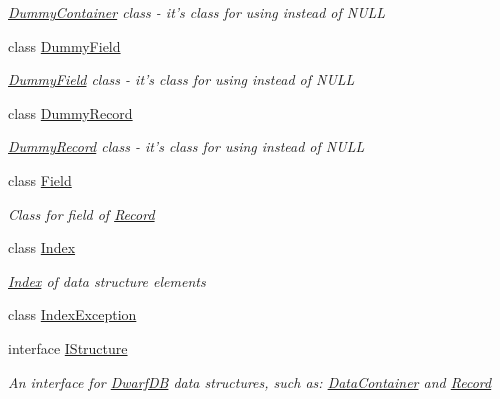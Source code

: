 \begin{DoxyCompactItemize}
\begin{DoxyCompactList}\small\item\em \hyperlink{class_dwarf_d_b_1_1_data_structures_1_1_dummy_container}{Dummy\+Container} class -\/ it's class for using instead of N\+U\+L\+L \end{DoxyCompactList}\item 
class \hyperlink{class_dwarf_d_b_1_1_data_structures_1_1_dummy_field}{Dummy\+Field}
\begin{DoxyCompactList}\small\item\em \hyperlink{class_dwarf_d_b_1_1_data_structures_1_1_dummy_field}{Dummy\+Field} class -\/ it's class for using instead of N\+U\+L\+L \end{DoxyCompactList}\item 
class \hyperlink{class_dwarf_d_b_1_1_data_structures_1_1_dummy_record}{Dummy\+Record}
\begin{DoxyCompactList}\small\item\em \hyperlink{class_dwarf_d_b_1_1_data_structures_1_1_dummy_record}{Dummy\+Record} class -\/ it's class for using instead of N\+U\+L\+L \end{DoxyCompactList}\item 
class \hyperlink{class_dwarf_d_b_1_1_data_structures_1_1_field}{Field}
\begin{DoxyCompactList}\small\item\em Class for field of \hyperlink{class_dwarf_d_b_1_1_data_structures_1_1_record}{Record} \end{DoxyCompactList}\item 
class \hyperlink{class_dwarf_d_b_1_1_data_structures_1_1_index}{Index}
\begin{DoxyCompactList}\small\item\em \hyperlink{class_dwarf_d_b_1_1_data_structures_1_1_index}{Index} of data structure elements \end{DoxyCompactList}\item 
class \hyperlink{class_dwarf_d_b_1_1_data_structures_1_1_index_exception}{Index\+Exception}
\item 
interface \hyperlink{interface_dwarf_d_b_1_1_data_structures_1_1_i_structure}{I\+Structure}
\begin{DoxyCompactList}\small\item\em An interface for \hyperlink{namespace_dwarf_d_b}{Dwarf\+D\+B} data structures, such as\+: \hyperlink{class_dwarf_d_b_1_1_data_structures_1_1_data_container}{Data\+Container} and \hyperlink{class_dwarf_d_b_1_1_data_structures_1_1_record}{Record} \end{DoxyCompactList}\item 

\end{DoxyCompactItemize}
